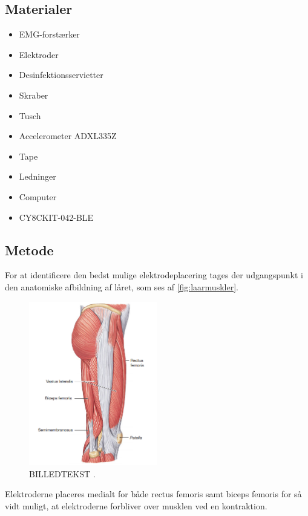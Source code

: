 \subsection{Materialer} 
\begin{itemize}
\item EMG-forstærker
\item Elektroder %
\item Desinfektionsservietter
\item Skraber
\item Tusch 
\item Accelerometer ADXL335Z
\item Tape
\item Ledninger %
\item Computer
\item CY8CKIT-042-BLE
\end{itemize}

\subsection{Metode}
For at identificere den bedst mulige elektrodeplacering tages der udgangspunkt i den anatomiske afbildning af låret, som ses af \autoref{fig:laarmuskler}.

\begin{figure}[H]
\centering
\includegraphics[width=0.5\textwidth]{figures/laarmuskler.png}
\caption{BILLEDTEKST \citep{martini2012}.}
\label{fig:laarmuskler}
\end{figure}

Elektroderne placeres medialt for både rectus femoris samt biceps femoris for så vidt muligt, at elektroderne forbliver over musklen ved en kontraktion. 


